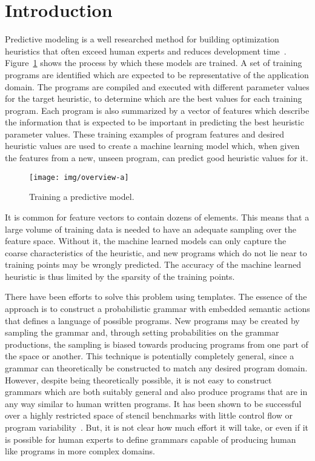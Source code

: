 \section{Introduction}

Predictive modeling is a well researched method for building optimization heuristics that often exceed human experts and reduces development time~\cite{Micolet2016,Wang2014c,Magni2014,Cummins2016,Wang2009,Wen2015,Wang2010,Falch2015,Collins2012,Leather2014,Ogilvie2014a}. Figure~\ref{fig:overview} shows the process by which these models are trained. A set of training programs are identified which are expected to be representative of the application domain. The programs are compiled and executed with different parameter values for the target heuristic, to determine which are the best values for each training program. Each program is also summarized by a vector of features which describe the information that is expected to be important in predicting the best heuristic parameter values. These training examples of program features and desired heuristic values are used to create a machine learning model which, when given the features from a new, unseen program, can predict good heuristic values for it.

\begin{figure}
  \texttt{[image: img/overview-a]}%
  \caption{Training a predictive model.}%
  \label{fig:overview}
\end{figure}

It is common for feature vectors to contain dozens of elements. This means that a large volume of training data is needed to have an adequate sampling over the feature space. Without it, the machine learned models can only capture the coarse characteristics of the heuristic, and new programs which do not lie near to training points may be wrongly predicted. The accuracy of the machine learned heuristic is thus limited by the sparsity of the training points.

There have been efforts to solve this problem using templates. The essence of the approach is to construct a probabilistic grammar with embedded semantic actions that defines a language of possible programs. New programs may be created by sampling the grammar and, through setting probabilities on the grammar productions, the sampling is biased towards producing programs from one part of the space or another. This technique is potentially completely general, since a grammar can theoretically be constructed to match any desired program domain. However, despite being theoretically possible, it is not easy to construct grammars which are both suitably general and also produce programs that are in any way similar to human written programs. It has been shown to be successful over a highly restricted space of stencil benchmarks with little control flow or program variability~\cite{Falch2015,Cummins2016}. But, it is not clear how much effort it will take, or even if it is possible for human experts to define grammars capable of producing human like programs in more complex domains.


